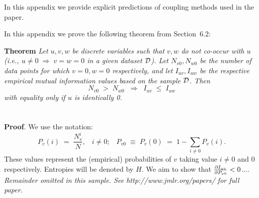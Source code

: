 

In this appendix we provide explicit predictions of coupling methods used in the paper.



In this appendix we prove the following theorem from
Section~6.2:

\noindent
{\bf Theorem} {\it Let $u,v,w$ be discrete variables such that $v, w$ do
	not co-occur with $u$ (i.e., $u\neq0\;\Rightarrow \;v=w=0$ in a given
	dataset ${\cal D}$). Let $N_{v0},N_{w0}$ be the number of data points for
	which $v=0, w=0$ respectively, and let $I_{uv},I_{uw}$ be the
	respective empirical mutual information values based on the sample
	${\cal D}$. Then
	\[
	N_{v0} \;>\; N_{w0}\;\;\Rightarrow\;\;I_{uv} \;\leq\;I_{uw}
	\]
	with equality only if $u$ is identically 0.} \hfill\BlackBox

\section{}

\noindent
{\bf Proof}. We use the notation:
\[
P_v(i) \;=\;\frac{N_v^i}{N},\;\;\;i \neq 0;\;\;\;
P_{v0}\;\equiv\;P_v(0)\; = \;1 - \sum_{i\neq 0}P_v(i).
\]
These values represent the (empirical) probabilities of $v$
taking value $i\neq 0$ and 0 respectively.  Entropies will be denoted
by $H$. We aim to show that $\frac{\partial I_{uv}}{\partial P_{v0}} < 0$....\\

{\noindent \em Remainder omitted in this sample. See http://www.jmlr.org/papers/ for full paper.}